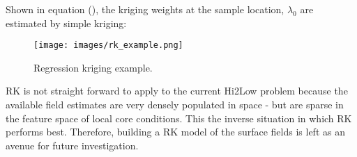 Shown in equation (), the kriging weights at the sample location, $\lambda_0$ are estimated by simple kriging:

\begin{figure}[hbtp]
\centering
\texttt{[image: images/rk\_example.png]}
\caption{Regression kriging example.}
\label{fit:rk}
\end{figure}

RK is not straight forward to apply to the current Hi2Low problem because the available field estimates are very densely populated in space - but are sparse in the feature space of local core conditions. This the inverse situation in which RK performs best. Therefore, building a RK model of the surface fields is left as an avenue for future investigation.

